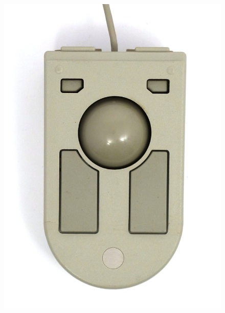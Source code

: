 \documentclass[11pt, a4paper]{article}
\begin{document}
\begin{figure}[h]
    \centering
    \includegraphics[scale=0.5]{1992_ibm_convertible/top_60.jpg}

\end{figure}
\end{document}
